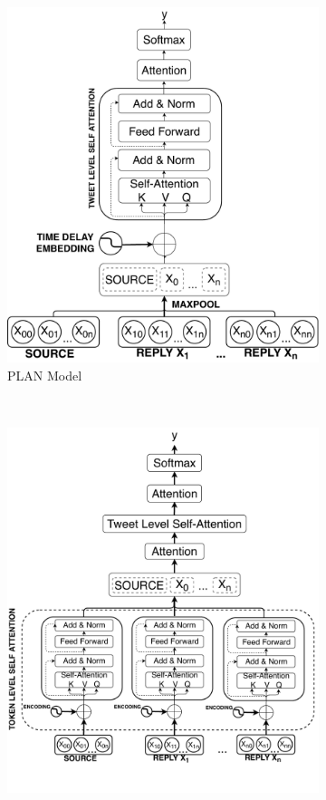 \documentclass[letterpaper]{article} %
\begin{document}
\begin{figure}
\centering
\begin{subfigure}{0.4\columnwidth}
\centering
\includegraphics[width=\columnwidth]{PLAN_model.pdf}
\caption{PLAN Model}
\label{fig:plan}
\end{subfigure}
~
\begin{subfigure}{0.5\columnwidth}
\centering
\includegraphics[width=\columnwidth]{StA_HiTPLAN_model.pdf}

\end{subfigure}
\end{figure}
\end{document}
